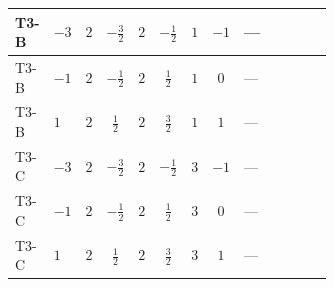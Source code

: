 \documentclass[8pt]{article}
\begin{document}
\begin{landscape}
\begin{longtable}{@{}llcccccc >{\raggedright\arraybackslash}p{0.21\linewidth} >{\raggedright\arraybackslash}p{0.21\linewidth} >{\raggedright\arraybackslash}p{0.21\linewidth}@{}}
\midrule
T3-B & $-3$ & $2$ & $-\frac{3}{2}$ & $2$ & $-\frac{1}{2}$ & $1$ & $-1$ & --- & \scriptsize\adjustbox{max width=\linewidth}{$\begin{gathered} +4 {\lambda_{12}^{(1)}}^2\end{gathered}$} & \scriptsize\adjustbox{max width=\linewidth}{$\begin{gathered} +4 {\lambda_{HS_2}^{(1)}}^2\end{gathered}$} \\
\midrule
T3-B & $-1$ & $2$ & $-\frac{1}{2}$ & $2$ & $\frac{1}{2}$ & $1$ & $0$ & --- & \scriptsize\adjustbox{max width=\linewidth}{$\begin{gathered} +4 {\lambda_{12}^{(1)}}^2\end{gathered}$} & \scriptsize\adjustbox{max width=\linewidth}{$\begin{gathered} +4 {\lambda_{HS_2}^{(1)}}^2\end{gathered}$} \\
\midrule
T3-B & $1$ & $2$ & $\frac{1}{2}$ & $2$ & $\frac{3}{2}$ & $1$ & $1$ & --- & \scriptsize\adjustbox{max width=\linewidth}{$\begin{gathered} +4 {\lambda_{12}^{(1)}}^2\end{gathered}$} & \scriptsize\adjustbox{max width=\linewidth}{$\begin{gathered} +4 {\lambda_{HS_2}^{(1)}}^2\end{gathered}$} \\
\midrule
T3-C & $-3$ & $2$ & $-\frac{3}{2}$ & $2$ & $-\frac{1}{2}$ & $3$ & $-1$ & --- & \scriptsize\adjustbox{max width=\linewidth}{$\begin{gathered} +4 {\lambda_{12}^{(1)}}^2\end{gathered}$} & \scriptsize\adjustbox{max width=\linewidth}{$\begin{gathered} +4 {\lambda_{HS_2}^{(1)}}^2\end{gathered}$} \\
\midrule
T3-C & $-1$ & $2$ & $-\frac{1}{2}$ & $2$ & $\frac{1}{2}$ & $3$ & $0$ & --- & \scriptsize\adjustbox{max width=\linewidth}{$\begin{gathered} +4 {\lambda_{12}^{(1)}}^2\end{gathered}$} & \scriptsize\adjustbox{max width=\linewidth}{$\begin{gathered} +4 {\lambda_{HS_2}^{(1)}}^2\end{gathered}$} \\
\midrule
T3-C & $1$ & $2$ & $\frac{1}{2}$ & $2$ & $\frac{3}{2}$ & $3$ & $1$ & --- & \scriptsize\adjustbox{max width=\linewidth}{$\begin{gathered} +4 {\lambda_{12}^{(1)}}^2\end{gathered}$} & \scriptsize\adjustbox{max width=\linewidth}{$\begin{gathered} +4 {\lambda_{HS_2}^{(1)}}^2\end{gathered}$} \\

\end{longtable}
\end{landscape}
\end{document}
